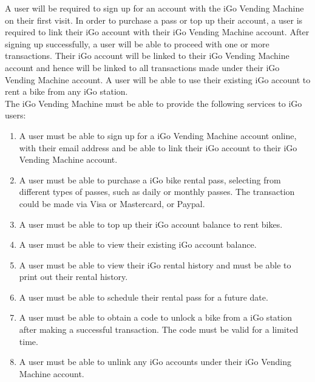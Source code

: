 A user will be required to sign up for an account with the iGo Vending Machine on their first visit. In order to purchase a pass or top up their account, a user is required to link their iGo account with their iGo Vending Machine account. After signing up successfully, a user will be able to proceed with one or more transactions. Their iGo account will be linked to their iGo Vending Machine account and hence will be linked to all transactions made under their iGo Vending Machine account. A user will be able to use their existing iGo account to rent a bike from any iGo station.\\



The iGo Vending Machine must be able to provide the following services to iGo users:
\begin{enumerate}
    \item A user must be able to sign up for a iGo Vending Machine account online, with their email address and be able to link their iGo account to their iGo Vending Machine account.
    \item A user must be able to purchase a iGo bike rental pass, selecting from different types of passes, such as daily or monthly passes. The transaction could be made via Visa or Mastercard, or Paypal.
    \item A user must be able to top up their iGo account balance to rent bikes.
    \item A user must be able to view their existing iGo account balance.
    \item A user must be able to view their iGo rental history and must be able to print out their rental history.
    \item A user must be able to schedule their rental pass for a future date.
    \item A user must be able to obtain a code to unlock a bike from a iGo station after making a successful transaction. The code must be valid for a limited time.
    \item A user must be able to unlink any iGo accounts under their iGo Vending Machine account.
\end{enumerate}

